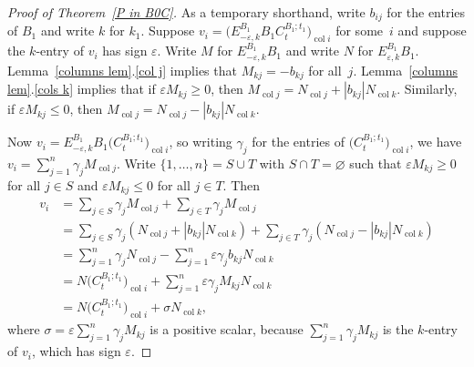 \documentclass{amsart}
\theoremstyle{definition}
\theoremstyle{remark}
\numberwithin{equation}{section}
\newcommand{\ep}{\varepsilon}
\newcommand{\col}{\operatorname{col}}
\newcommand{\set}[1]{{\lbrace #1 \rbrace}}
\newcommand{\0}{{\mathbf{0}}}
\begin{document}
\begin{proof}[Proof of Theorem~\ref{P in B0C}]
As a temporary shorthand, write $b_{ij}$ for the entries of $B_1$ and write $k$ for $k_1$.
Suppose $v_i=\bigl(E^{B_1}_{-\ep,k}B_1C_t^{B_1;t_1}\bigr)_{\col i}$ for some~$i$ and suppose the $k$-entry of $v_i$ has sign $\ep$.
Write $M$ for $E^{B_1}_{-\ep,k}B_1$ and write $N$ for $E^{B_1}_{\ep,k}B_1$.
Lemma~\ref{columns lem}.\ref{col j} implies that $M_{kj}=-b_{kj}$ for all~$j$.
Lemma~\ref{columns lem}.\ref{cols k} implies that if $\ep M_{kj}\ge0$, then $M_{\col j}=N_{\col j}+|b_{kj}|N_{\col k}$.
Similarly, if $\ep M_{kj}\le0$, then $M_{\col j}=N_{\col j}-|b_{kj}|N_{\col k}$.


Now $v_i=E^{B_1}_{-\ep,k}B_1\bigl(C_t^{B_1;t_1}\bigr)_{\col i}$, so writing $\gamma_j$ for the entries of $\bigl(C_t^{B_1;t_1}\bigr)_{\col i}$, we have $v_i=\sum_{j=1}^n\gamma_jM_{\col j}$.
Write $\set{1,\ldots,n}=S\cup T$ with $S\cap T=\varnothing$ such that $\ep M_{kj}\ge0$ for all $j\in S$ and $\ep M_{kj}\le0$ for all $j\in T$.
Then
\begin{align*}
v_i
&=\sum_{j\in S}\gamma_jM_{\col j}+\sum_{j\in T}\gamma_jM_{\col j}\\
&=\sum_{j\in S}\gamma_j(N_{\col j}+|b_{kj}|N_{\col k})+\sum_{j\in T}\gamma_j(N_{\col j}-|b_{kj}|N_{\col k})\\
&=\sum_{j=1}^n\gamma_jN_{\col j}-\sum_{j=1}^n\ep\gamma_jb_{kj}N_{\col k}\\
&=N\bigl(C_t^{B_1;t_1}\bigr)_{\col i}+\sum_{j=1}^n\ep\gamma_jM_{kj}N_{\col k}\\
&=N\bigl(C_t^{B_1;t_1}\bigr)_{\col i}+\sigma N_{\col k},
\end{align*}
where $\sigma=\ep\sum_{j=1}^n\gamma_jM_{kj}$ is a positive scalar, because $\sum_{j=1}^n\gamma_jM_{kj}$ is the $k$-entry of $v_i$, which has sign $\ep$.


\end{proof}
\end{document}
